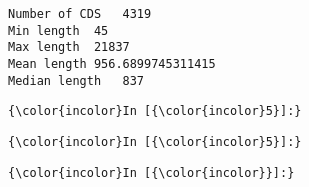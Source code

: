 \documentclass{article}
\begin{document}
    \begin{Verbatim}[commandchars=\\\{\}]
Number of CDS	4319
Min length	45
Max length	21837
Mean length	956.6899745311415
Median length	837
    \end{Verbatim}

    \begin{Verbatim}[commandchars=\\\{\}]
{\color{incolor}In [{\color{incolor}5}]:} 
\end{Verbatim}

    \begin{Verbatim}[commandchars=\\\{\}]
{\color{incolor}In [{\color{incolor}5}]:} 
\end{Verbatim}

    \begin{Verbatim}[commandchars=\\\{\}]
{\color{incolor}In [{\color{incolor}}]:} 
\end{Verbatim}


    
    
    
    
\end{document}
